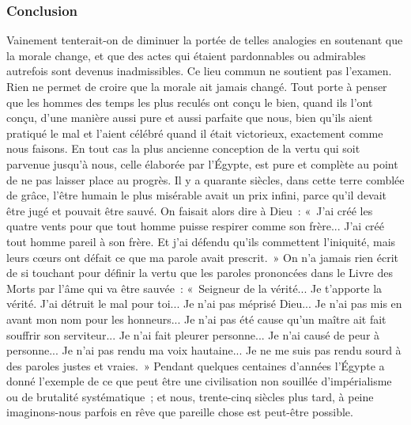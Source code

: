 \documentclass[french,twoside]{book} %
\begin{document}
\subsubsection[{Conclusion}]{Conclusion}
\noindent \par
Vainement tenterait-on de diminuer la portée de telles analogies en soutenant que la morale change, et que des actes qui étaient pardonnables ou admirables autrefois sont devenus inadmissibles. Ce lieu commun ne soutient pas l'examen. Rien ne permet de croire que la morale ait jamais changé. Tout porte à penser que les hommes des temps les plus reculés ont conçu le bien, quand ils l'ont conçu, d'une manière aussi pure et aussi parfaite que nous, bien qu'ils aient pratiqué le mal et l'aient célébré quand il était victorieux, exacte­ment comme nous faisons. En tout cas la plus ancienne conception de la vertu qui soit parvenue jusqu'à nous, celle élaborée par l'Égypte, est pure et complète au point de ne pas laisser place au progrès. Il y a quarante siècles, dans cette terre comblée de grâce, l'être humain le plus misérable avait un prix infini, parce qu'il devait être jugé et pouvait être sauvé. On faisait alors dire à Dieu : « J'ai créé les quatre vents pour que tout homme puisse respirer comme son frère... J'ai créé tout homme pareil à son frère. Et j'ai défendu qu'ils commettent l'iniquité, mais leurs cœurs ont défait ce que ma parole avait prescrit. » On n'a jamais rien écrit de si touchant pour définir la vertu que les paroles prononcées dans le Livre des Morts par l'âme qui va être sauvée : « Seigneur de la vérité... Je t'apporte la vérité. J'ai détruit le mal pour toi... Je n'ai pas méprisé Dieu... Je n'ai pas mis en avant mon nom pour les honneurs... Je n'ai pas été cause qu'un maître ait fait souffrir son serviteur... Je n'ai fait pleurer personne... Je n'ai causé de peur à personne... Je n'ai pas rendu ma voix hautaine... Je ne me suis pas rendu sourd à des paroles justes et vraies. » Pendant quelques centaines d'années l'Égypte a donné l'exemple de ce que peut être une civilisation non souillée d'impérialisme ou de brutalité systéma­tique ; et nous, trente-cinq siècles plus tard, à peine imaginons-nous parfois en rêve que pareille chose est peut-être possible.\par
\end{document}
